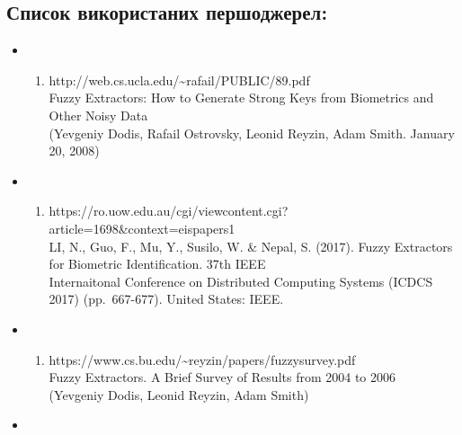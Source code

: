 \documentclass[11pt]{article}
\providecommand{\tightlist}{%
      \setlength{\itemsep}{0pt}\setlength{\parskip}{0pt}}
\begin{document}
\vspace{60ex}

    \hypertarget{ux441ux43fux438ux441ux43eux43a-ux432ux438ux43aux43eux440ux438ux441ux442ux430ux43dux438ux445-ux43fux435ux440ux448ux43eux434ux436ux435ux440ux435ux43b}{%
\subsection{Список використаних
першоджерел:}\label{ux441ux43fux438ux441ux43eux43a-ux432ux438ux43aux43eux440ux438ux441ux442ux430ux43dux438ux445-ux43fux435ux440ux448ux43eux434ux436ux435ux440ux435ux43b}}

\begin{itemize}
\item
  \begin{enumerate}
  \def\labelenumi{(\arabic{enumi})}
  \tightlist
  \item
    http://web.cs.ucla.edu/\textasciitilde rafail/PUBLIC/89.pdf\\
    Fuzzy Extractors: How to Generate Strong Keys from Biometrics and
    Other Noisy Data\\
    (Yevgeniy Dodis, Rafail Ostrovsky, Leonid Reyzin, Adam Smith.
    January 20, 2008)
  \end{enumerate}
\item
  \begin{enumerate}
  \def\labelenumi{(\arabic{enumi})}
  \setcounter{enumi}{1}
  \tightlist
  \item
    https://ro.uow.edu.au/cgi/viewcontent.cgi?article=1698\&context=eispapers1\\
    LI, N., Guo, F., Mu, Y., Susilo, W. \& Nepal, S. (2017). Fuzzy
    Extractors for Biometric Identification. 37th IEEE\\
    Internaitonal Conference on Distributed Computing Systems (ICDCS
    2017) (pp.~667-677). United States: IEEE.
  \end{enumerate}
\item
  \begin{enumerate}
  \def\labelenumi{(\arabic{enumi})}
  \setcounter{enumi}{2}
  \tightlist
  \item
    https://www.cs.bu.edu/\textasciitilde reyzin/papers/fuzzysurvey.pdf\\
    Fuzzy Extractors. A Brief Survey of Results from 2004 to 2006\\
    (Yevgeniy Dodis, Leonid Reyzin, Adam Smith)
  \end{enumerate}
\item
  \begin{enumerate}

\end{enumerate}
\end{itemize}
\end{document}
